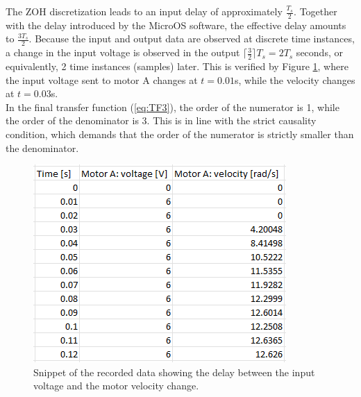 \documentclass[a4paper,kul]{kulakarticle} %
\begin{document}
The ZOH discretization leads to an input delay of approximately $\frac{T_s}{2}$. Together with the delay introduced by the MicroOS software, the effective delay amounts to $\frac{3T_s}{2}$. Because the input and output data are observed at discrete time instances, a change in the input voltage is observed in the output $\lceil \frac{3}{2} \rceil T_s = 2T_s$ seconds, or equivalently, 2 time instances (samples) later. This is verified by Figure \ref{fig:delay}, where the input voltage sent to motor A changes at $t = 0.01$s, while the velocity changes at $t = 0.03$s. \\
\noindent In the final transfer function (\ref{eq:TF3}), the order of the numerator is 1, while the order of the denominator is 3. This is in line with the strict causality condition, which demands that the order of the numerator is strictly smaller than the denominator. 

\begin{figure}
	\centering
	\includegraphics[width=.5\linewidth]{delay.png}
	\caption{Snippet of the recorded data showing the delay between the input voltage and the motor velocity change.}
	\label{fig:delay}
\end{figure}


\end{document}
